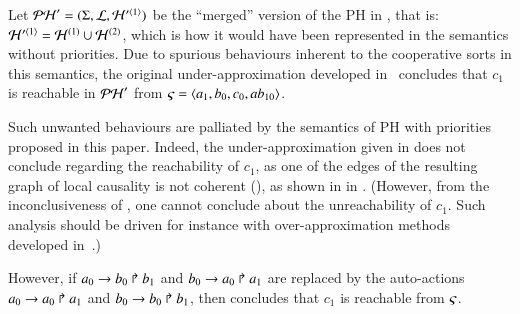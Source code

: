 \begin{example}
  Let $\mathcal{PH}' = (\Sigma, \mathcal{L}, \mathcal{H}'^{\langle 1 \rangle})$ be the “merged” version of the PH in , that is: $\mathcal{H}'^{\langle 1 \rangle} = \mathcal{H}^{(1)} \cup \mathcal{H}^{(2)}$,
  which is how it would have been represented in the semantics without priorities.
  Due to spurious behaviours inherent to the cooperative sorts in this semantics, 
  the original under-approximation developed in~\cite{PMR12-MSCS} concludes that $c_1$ is reachable in $\mathcal{PH}'$ from $\varsigma = \mbox{$\langle a_1, b_0, c_0, ab_{10} \rangle$}$.
  
  Such unwanted behaviours are palliated by the semantics of PH with priorities proposed in this paper.
  Indeed, the under-approximation given in  does not conclude regarding the reachability of $c_1$,
  as one of the edges of the resulting graph of local causality is not coherent (),
  as shown in in .
  (However, from the inconclusiveness of , one cannot conclude about the unreachability of $c_1$.
  Such analysis should be driven for instance with over-approximation methods developed in~\cite{PMR12-MSCS}.)
  
  However, if $a_0\rightarrow b_0\Rsh b_1$ and $b_0\rightarrow a_0\Rsh a_1$ are replaced by the auto-actions
  $a_0\rightarrow a_0\Rsh a_1$ and $b_0\rightarrow b_0\Rsh b_1$,
  then  concludes that $c_1$ is reachable from $\varsigma$.

\begin{figure}[tp]
  \centering
\end{figure}
\end{example}
